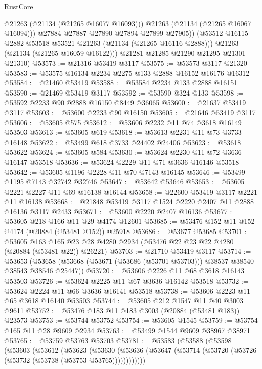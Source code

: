 \begin{lexlean}{RustCore}
\begin{coremodule}
                @21263
                (@21134 (@21265 @16077 @16093)))
              @21263
              (@21134 (@21265 @16067 @16094)))
            @27884
            @27887
            @27890
            @27894
            @27899
            @27905))
        (@53512 @16115 @2882 @53518 @53521 @21263 (@21134 (@21265 @16116 @2888)))
        @21263
        (@21134 (@21265 @16059 @16122)))
      @21281
      @21285
      @21290
      @21295
      @21301
      @21310)
@53573 := @21316 @53419 @3117
@53575 := @53573 @3117 @21320
@53583 := @53575 @16134 @2234 @2275 @133 @2888 @16152 @16176 @16312
@53584 := @21460 @53419
@53588 := @53584 @2234 @133 @2888 @16151
@53590 := @21469 @53419 @3117
@53592 := @53590 @324 @133
@53598 := @53592 @2233 @90 @2888 @16150 @8449 @36065
@53600 := @21637 @53419 @3117
@53603 := @53600 @2233 @90 @16150
@53605 := @21646 @53419 @3117
@53606 := @53605 @575
@53612 := @53606 @2232 @11 @74 @3618 @16149 @53503
@53613 := @53605 @619
@53618 := @53613 @2231 @11 @73 @3733 @16148
@53622 := @53499 @618 @3733 @24402 @24406
@53623 := @53618 @53622
@53624 := @53605 @584
@53630 := @53624 @2230 @11 @72 @3636 @16147 @53518
@53636 := @53624 @2229 @11 @71 @3636 @16146 @53518
@53642 := @53605 @1196 @2228 @11 @70 @7143 @16145
@53646 := @53499 @1195 @7143 @32742 @32746
@53647 := @53642 @53646
@53653 := @53605 @2221 @2227 @11 @69 @16138 @16144
@53658 := @22600 @53419 @3117 @2221 @11 @16138
@53668 := @21848 @53419 @3117 @1524 @2220 @2407 @11 @2888 @16136 @3117 @2433
@53671 := @53600 @2220 @2407 @16136
@53677 := @53605 @218 @166 @11 @29 @4174 @12601
@53685 := @53476 @152 @11 @152 @4174 (@20884 (@53481 @152)) @25918
@53686 := @53677 @53685
@53701 := @53605
    @163
    @165
    @23
    @28
    @4280
    @2934
    (@53476 @22 @23 @22 @4280 (@20884 (@53481 @22)) @26221)
@53703 := @21710 @53419 @3117
@53714 := @53653
    (@53658 (@53668 (@53671 (@53686 (@53701 @53703))) @38537 @38540 @38543 @38546 @25447))
@53720 := @53606 @2226 @11 @68 @3618 @16143 @53503
@53726 := @53624 @2225 @11 @67 @3636 @16142 @53518
@53732 := @53624 @2224 @11 @66 @3636 @16141 @53518
@53738 := @53606 @2223 @11 @65 @3618 @16140 @53503
@53744 := @53605 @212 @1547 @11 @40 @3003 @9611
@53752 := @53476 @183 @11 @183 @3003 (@20884 (@53481 @183)) @23573
@53753 := @53744 @53752
@53754 := @53605 @1545
@53759 := @53754 @165 @11 @28 @9609 @2934
@53763 := @53499 @1544 @9609 @38967 @38971
@53765 := @53759 @53763 @53703
@53781 := @53583
    (@53588
      (@53598
        (@53603
          (@53612
            (@53623
              (@53630
                (@53636 (@53647 (@53714 (@53720 (@53726 (@53732 (@53738 (@53753 @53765))))))))))))

\end{coremodule}
\end{lexlean}
